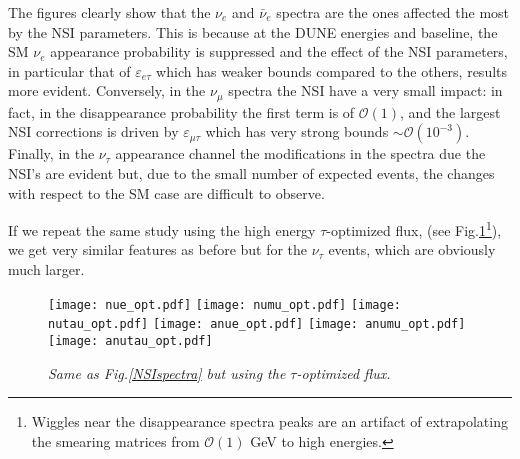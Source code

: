 \documentclass[12pt]{article}
\begin{document}
The figures clearly show that the $\nu_e$ and $\bar{\nu}_e$ spectra are the ones affected the most by the NSI parameters. This is because at the DUNE energies and baseline, the SM $\nu_e$ appearance probability is suppressed and the effect of the NSI parameters, in particular that of $\varepsilon_{e\tau}$ which has weaker bounds compared to the others, results more evident. 
Conversely, in the $\nu_\mu$ spectra the NSI have a very small impact: in fact, in the disappearance probability the first term is of $\mathcal{O}(1)$, and the largest NSI corrections is driven by $\varepsilon_{\mu\tau}$ which has very strong bounds $\sim \mathcal{O}(10^{-3})$.\\
Finally, in the $\nu_\tau$ appearance channel the modifications in the spectra due the NSI's are evident but, due to the small number of expected events, the changes with respect to the SM case are difficult to observe. 

If we repeat the same study using the high energy $\tau$-optimized flux, (see Fig.\ref{NSIspectra_opt}\footnote{Wiggles near the disappearance spectra peaks are an artifact of extrapolating the smearing matrices from $\mathcal{O}(1)$ GeV to high energies.}), we get very similar features as before but for the $\nu_\tau$ events, which are obviously much larger. %

\begin{figure}
    \centering
    \texttt{[image: nue\_opt.pdf]}
    \texttt{[image: numu\_opt.pdf]}
    \texttt{[image: nutau\_opt.pdf]}
    \texttt{[image: anue\_opt.pdf]}
    \texttt{[image: anumu\_opt.pdf]}
    \texttt{[image: anutau\_opt.pdf]}
    \caption{\it Same as Fig.\ref{NSIspectra} but  using the $\tau$-optimized flux.}
    \label{NSIspectra_opt}
\end{figure}
\end{document}
